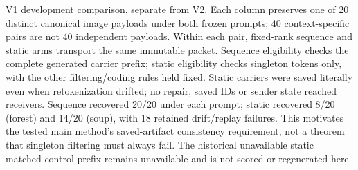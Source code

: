 \caption{V1 development comparison, separate from V2. Each column preserves one of 20 distinct canonical image payloads under both frozen prompts; 40 context-specific pairs are not 40 independent payloads. Within each pair, fixed-rank sequence and static arms transport the same immutable packet. Sequence eligibility checks the complete generated carrier prefix; static eligibility checks singleton tokens only, with the other filtering/coding rules held fixed. Static carriers were saved literally even when retokenization drifted; no repair, saved IDs or sender state reached receivers. Sequence recovered 20/20 under each prompt; static recovered 8/20 (forest) and 14/20 (soup), with 18 retained drift/replay failures. This motivates the tested main method’s saved-artifact consistency requirement, not a theorem that singleton filtering must always fail. The historical unavailable static matched-control prefix remains unavailable and is not scored or regenerated here.}
\label{fig:figureS2_text_consistency}
